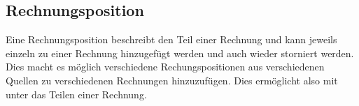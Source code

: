 \documentclass[../../Pflichtenheft.tex]{subfiles}
\begin{document}
    \subsection{Rechnungsposition}
    Eine Rechnungsposition beschreibt den Teil einer Rechnung und kann jeweils einzeln zu
    einer Rechnung hinzugefügt werden und auch wieder storniert werden. Dies macht es möglich
    verschiedene Rechungspositionen aus verschiedenen Quellen zu verschiedenen Rechnungen hinzuzufügen.
    Dies ermöglicht also mit unter das Teilen einer Rechnung.
\end{document}
